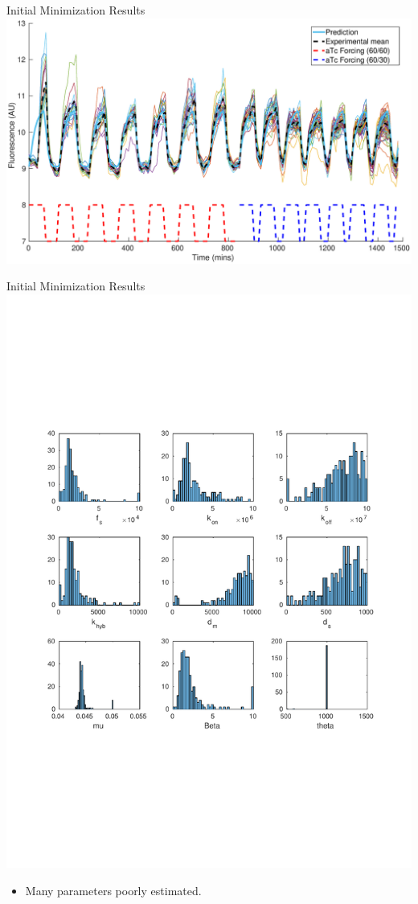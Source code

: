 \documentclass{beamer}
\begin{document}
\begin{frame}{Initial Minimization Results}
  \includegraphics[scale = 0.26, clip = true, trim = 50 0 0 0]{../Figures/13_9_bestPlot}
\end{frame}


\begin{frame}{Initial Minimization Results}
  \includegraphics[scale = 0.22, clip = true, trim = 0 0 0 0]{../Figures/13_9_hist}
        \begin{itemize}
    \item Many parameters poorly estimated.
            \end{itemize}
\end{frame}
\end{document}
